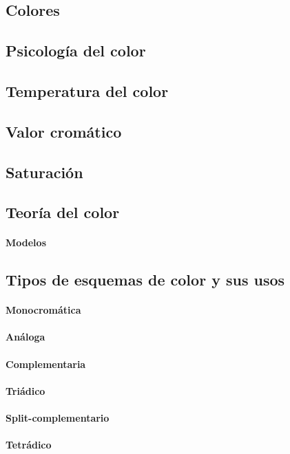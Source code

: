 \documentclass[12pt]{report}
\begin{document}
		\subsection{Colores}
		\subsection{Psicología del color}
		\subsection{Temperatura del color}
		\subsection{Valor cromático}
		\subsection{Saturación}
		\subsection{Teoría del color}
			\paragraph{Modelos}
		\subsection{Tipos de esquemas de color y sus usos}
			\paragraph{Monocromática}
			\paragraph{Análoga}
			\paragraph{Complementaria}
			\paragraph{Triádico}
			\paragraph{Split-complementario}
			\paragraph{Tetrádico}
\end{document}
